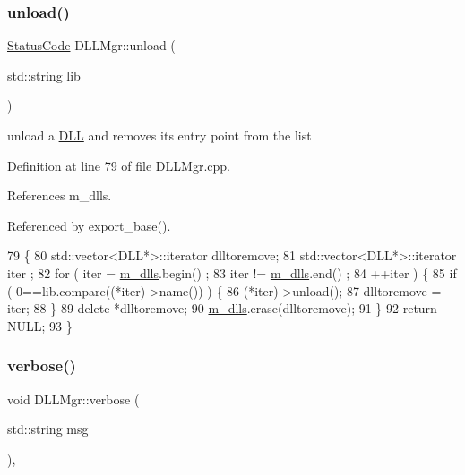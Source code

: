 \subsubsection{\texorpdfstring{unload()}{unload()}}
{\footnotesize\ttfamily \hyperlink{classStatusCode}{Status\+Code} D\+L\+L\+Mgr\+::unload (\begin{DoxyParamCaption}\item[{std\+::string}]{lib }\end{DoxyParamCaption})}

unload a \hyperlink{classDLL}{D\+LL} and removes its entry point from the list 

Definition at line 79 of file D\+L\+L\+Mgr.\+cpp.



References m\+\_\+dlls.



Referenced by export\+\_\+base().


\begin{DoxyCode}
79                                           \{
80   std::vector<DLL*>::iterator dlltoremove;
81   std::vector<DLL*>::iterator iter ;
82   \textcolor{keywordflow}{for} ( iter = \hyperlink{classDLLMgr_a5bd713edea21d64f32aa71162bca581a}{m\_dlls}.begin() ; 
83         iter != \hyperlink{classDLLMgr_a5bd713edea21d64f32aa71162bca581a}{m\_dlls}.end()  ; 
84         ++iter ) \{
85     \textcolor{keywordflow}{if} ( 0==lib.compare((*iter)->name()) ) \{
86       (*iter)->unload();
87       dlltoremove = iter;
88     \}
89     \textcolor{keyword}{delete} *dlltoremove;
90     \hyperlink{classDLLMgr_a5bd713edea21d64f32aa71162bca581a}{m\_dlls}.erase(dlltoremove);
91   \}
92   \textcolor{keywordflow}{return} NULL;
93 \}
\end{DoxyCode}
\mbox{\label{classDLLMgr_a47c406fbca0df2aaa8569e0e99927d32}} 
\subsubsection{\texorpdfstring{verbose()}{verbose()}\hspace{0.1cm}{\footnotesize\ttfamily [1/2]}}
{\footnotesize\ttfamily void D\+L\+L\+Mgr\+::verbose (\begin{DoxyParamCaption}\item[{std\+::string}]{msg }\end{DoxyParamCaption})\hspace{0.3cm}{\ttfamily [inline]}, {\ttfamily [private]}}



